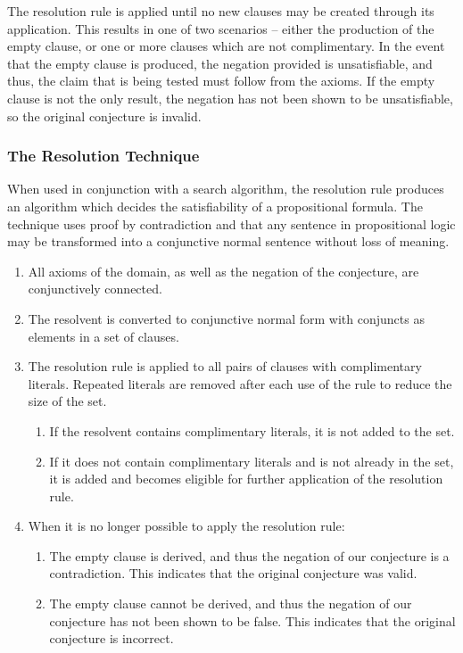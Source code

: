 The resolution rule is applied until no new clauses may be created through its application. This results in one of two scenarios -- either the production of the empty clause, or one or more clauses which are not complimentary. In the event that the empty clause is produced, the negation provided is unsatisfiable, and thus, the claim that is being tested must follow from the axioms. If the empty clause is not the only result, the negation has not been shown to be unsatisfiable, so the original conjecture is invalid.

\subsubsection{The Resolution Technique}

When used in conjunction with a search algorithm, the resolution rule produces an algorithm which decides the satisfiability of a propositional formula. The technique uses proof by contradiction and that any sentence in propositional logic may be transformed into a conjunctive normal sentence without loss of meaning.

\begin{enumerate}
	\item All axioms of the domain, as well as the negation of the conjecture, are conjunctively connected.
	\item The resolvent is converted to conjunctive normal form with conjuncts as elements in a set of clauses.
	\item The resolution rule is applied to all pairs of clauses with complimentary literals. Repeated literals are removed after each use of the rule to reduce the size of the set.
		\begin{enumerate}
			\item If the resolvent contains complimentary literals, it is not added to the set.
			\item If it does not contain complimentary literals and is not already in the set, it is added and becomes eligible for further application of the resolution rule.
		\end{enumerate}
	\item When it is no longer possible to apply the resolution rule:
		\begin{enumerate}
			\item The empty clause is derived, and thus the negation of our conjecture is a contradiction. This indicates that the original conjecture was valid.
			\item The empty clause cannot be derived, and thus the negation of our conjecture has not been shown to be false. This indicates that the original conjecture is incorrect.
		\end{enumerate}
\end{enumerate}

